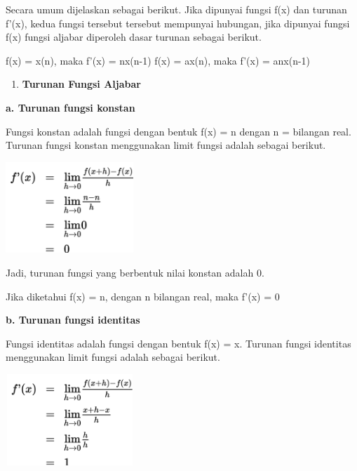 \documentclass[11pt,fleqn]{book} %
\begin{document}
\noindent 
Secara umum dijelaskan sebagai berikut.  Jika dipunyai fungsi f(x) dan turunan f'(x), kedua fungsi tersebut tersebut mempunyai hubungan, jika dipunyai fungsi f(x) fungsi aljabar diperoleh dasar turunan sebagai berikut.

\noindent 
f(x) = x(n), maka f'(x) = nx(n-1)
f(x) = ax(n), maka f'(x) = anx(n-1)


\noindent
\begin{enumerate}
\item \textbf{Turunan Fungsi Aljabar}
\end{enumerate}

\noindent 
\noindent \textbf{a. Turunan fungsi konstan}

\noindent 
Fungsi konstan adalah fungsi dengan bentuk f(x) = n dengan n = bilangan real. Turunan fungsi konstan menggunakan limit fungsi adalah sebagai berikut.

\noindent 
\begin{center}
\includegraphics*[width=1.90in, height=1.35in]{Pictures/TurunanFungsi7.png}
\end{center}

\noindent 
Jadi, turunan fungsi yang berbentuk nilai konstan adalah 0.

\noindent 
Jika diketahui f(x) = n, dengan n bilangan real, maka f'(x) = 0\\

\noindent

\noindent 
\noindent \textbf{b. Turunan fungsi identitas}

\noindent 
Fungsi identitas adalah fungsi dengan bentuk f(x) = x. Turunan fungsi identitas menggunakan limit fungsi adalah sebagai berikut.

\noindent 
\begin{center}
\includegraphics*[width=1.90in, height=1.35in]{Pictures/TurunanFungsi8.png}
\end{center}
\end{document}
